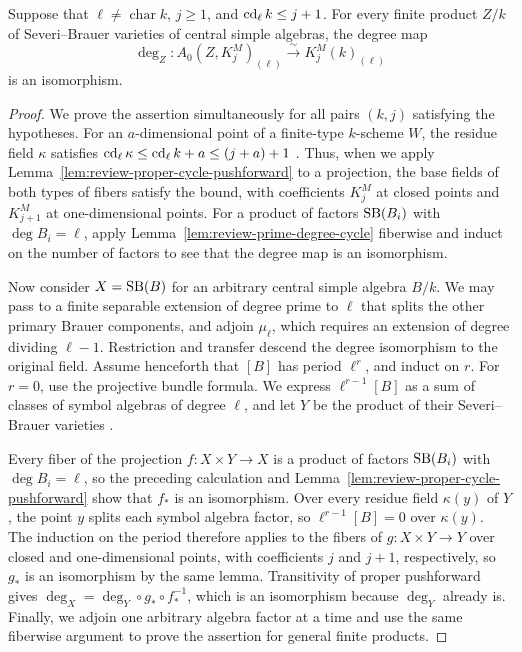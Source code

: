 \begin{proposition}
\label{prop:review-small-cd-cycle-degree}
Suppose that $\ell\ne\operatorname{char}k$, $j\ge1$, and $\operatorname{cd}_\ell k\le j+1$.
For every finite product $Z/k$ of Severi--Brauer varieties of central simple algebras, the degree map
\[
 \deg_Z:A_0(Z,K_j^M)_{(\ell)}\xrightarrow{\sim}K_j^M(k)_{(\ell)}
\]
is an isomorphism.
\end{proposition}
\begin{proof}
We prove the assertion simultaneously for all pairs $(k,j)$ satisfying the hypotheses.
For an $a$-dimensional point of a finite-type $k$-scheme $W$, the residue field $\kappa$ satisfies $\operatorname{cd}_\ell\kappa\le\operatorname{cd}_\ell k+a\le(j+a)+1$ \cite[II, \S4.2, Proposition 11]{SerreGalois}.
Thus, when we apply Lemma~\ref{lem:review-proper-cycle-pushforward} to a projection, the base fields of both types of fibers satisfy the bound, with coefficients $K_j^M$ at closed points and $K_{j+1}^M$ at one-dimensional points.
For a product of factors $\operatorname{SB}(B_i)$ with $\deg B_i=\ell$, apply Lemma~\ref{lem:review-prime-degree-cycle} fiberwise and induct on the number of factors to see that the degree map is an isomorphism.

Now consider $X=\operatorname{SB}(B)$ for an arbitrary central simple algebra $B/k$.
We may pass to a finite separable extension of degree prime to $\ell$ that splits the other primary Brauer components, and adjoin $\mu_\ell$, which requires an extension of degree dividing $\ell-1$.
Restriction and transfer descend the degree isomorphism to the original field.
Assume henceforth that $[B]$ has period $\ell^r$, and induct on $r$.
For $r=0$, use the projective bundle formula.
We express $\ell^{r-1}[B]$ as a sum of classes of symbol algebras of degree $\ell$, and let $Y$ be the product of their Severi--Brauer varieties \cite{MerkurjevSuslin1982,Voevodsky}.

Every fiber of the projection $f:X\times Y\to X$ is a product of factors $\operatorname{SB}(B_i)$ with $\deg B_i=\ell$, so the preceding calculation and Lemma~\ref{lem:review-proper-cycle-pushforward} show that $f_*$ is an isomorphism.
Over every residue field $\kappa(y)$ of $Y$, the point $y$ splits each symbol algebra factor, so $\ell^{r-1}[B]=0$ over $\kappa(y)$.
The induction on the period therefore applies to the fibers of $g:X\times Y\to Y$ over closed and one-dimensional points, with coefficients $j$ and $j+1$, respectively, so $g_*$ is an isomorphism by the same lemma.
Transitivity of proper pushforward gives $\deg_X=\deg_Y\circ g_*\circ f_*^{-1}$, which is an isomorphism because $\deg_Y$ already is.
Finally, we adjoin one arbitrary algebra factor at a time and use the same fiberwise argument to prove the assertion for general finite products.
\end{proof}


